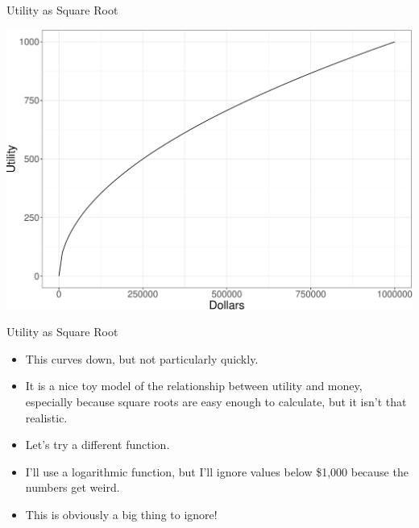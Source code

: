 \documentclass[
  ignorenonframetext,
]{beamer}
\providecommand{\tightlist}{%
  \setlength{\itemsep}{0pt}\setlength{\parskip}{0pt}}
\renewcommand{\,}{\text{, }}
\begin{document}
\begin{frame}{Utility as Square Root}
\protect\hypertarget{utility-as-square-root}{}

\begin{center}


\includegraphics[width=0.9\linewidth]{Lecture_4_m_e_files/figure-beamer/unnamed-chunk-1-1} 

\end{center}

\end{frame}

\begin{frame}{Utility as Square Root}
\protect\hypertarget{utility-as-square-root-1}{}

\begin{itemize}
\tightlist
\item
  This curves down, but not particularly quickly.
\item
  It is a nice toy model of the relationship between utility and money,
  especially because square roots are easy enough to calculate, but it
  isn't that realistic. \pause
\item
  Let's try a different function.
\item
  I'll use a logarithmic function, but I'll ignore values below \$1,000
  because the numbers get weird.
\item
  This is obviously a big thing to ignore!
\end{itemize}

\end{frame}
\end{document}
